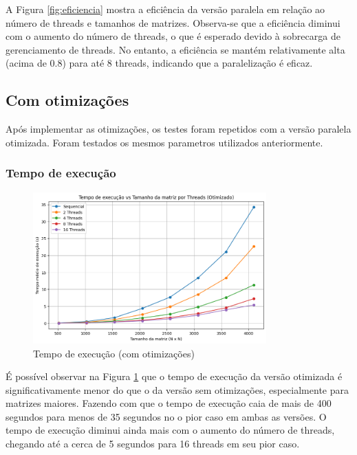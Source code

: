 \documentclass[12pt, a4paper]{article}
\begin{document}
	A Figura \ref{fig:eficiencia} mostra a eficiência da versão paralela em relação ao número de threads e tamanhos de matrizes. Observa-se que a eficiência diminui com o aumento do número de threads, o que é esperado devido à sobrecarga de gerenciamento de threads. No entanto, a eficiência se mantém relativamente alta (acima de 0.8) para até 8 threads, indicando que a paralelização é eficaz.

	\subsection{Com otimizações}

	Após implementar as otimizações, os testes foram repetidos com a versão paralela otimizada. Foram testados os mesmos parametros utilizados anteriormente.

	\subsubsection{Tempo de execução}

	\begin{figure}[H]
		\centering
		\includegraphics[width=0.8\textwidth]{img/execution-time-opt.png}
		\caption{Tempo de execução (com otimizações)}
		\label{fig:tempo_execucao_otimizado}
	\end{figure}

	É possível observar na Figura \ref{fig:tempo_execucao_otimizado} que o tempo de execução da versão otimizada é significativamente menor do que o da versão sem otimizações, especialmente para matrizes maiores. Fazendo com que o tempo de execução caia de mais de 400 segundos para menos de 35 segundos no o pior caso em ambas as versões. O tempo de execução diminui ainda mais com o aumento do número de threads, chegando até a cerca de 5 segundos para 16 threads em seu pior caso.
\end{document}
